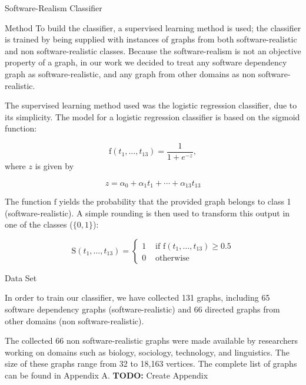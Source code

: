 \documentclass[11pt,twocolumn,a4paper,english]{article}
\newcommand{\TODO}{\textbf{TODO:} }
\begin{document}
\begin{section}{Software-Realism Classifier}
\begin{subsection}{Method}
To build the classifier, a  supervised learning method is used; the classifier is trained by being supplied with instances of graphs from both software-realistic and non software-realistic classes. Because the software-realism is not an objective property of a graph, in our work we decided to treat any software dependency graph as software-realistic, and any graph from other domains as non software-realistic.

The supervised learning method used was the logistic regression classifier, due to its simplicity. The model for a logistic regression classifier is based on the sigmoid function:

$$
	\mathrm{f}(t_1, \ldots, t_{13}) = \frac{1}{1 + e^{-z}}\mathrm{,}
$$
where $z$ is given by

$$
  z = \alpha_0 + \alpha_1t_1 + \cdots + \alpha_{13}t_{13}
$$

The function $\mathrm{f}$ yields the probability that the provided graph belongs to class 1 (software-realistic). A simple rounding is then used to transform this output in one of the classes ($\{0, 1\}$):

$$
\mathrm{S}(t_1, \ldots, t_{13}) = \left\{ \begin{array}{rl}
 1 &\mbox{ if } \mathrm{f}(t_1, \ldots, t_{13}) \ge 0.5 \\
 0 &\mbox{ otherwise}
       \end{array} \right.
$$
% 
% 

\begin{subsubsection}{Data Set} \label{sec:data-set}
	
	In order to train our classifier, we have collected 131 graphs, including 65 software dependency graphs (software-realistic) and 66  directed graphs from other domains (non software-realistic).
	
	The collected 66 non software-realistic graphs were made available by researchers working on domains such as biology, sociology, technology, and linguistics. The size of these graphs range from 32 to 18,163 vertices. The complete list of graphs can be found in Appendix A. \TODO Create Appendix
	

\end{subsubsection}
\end{subsection}
\end{section}
\end{document}
